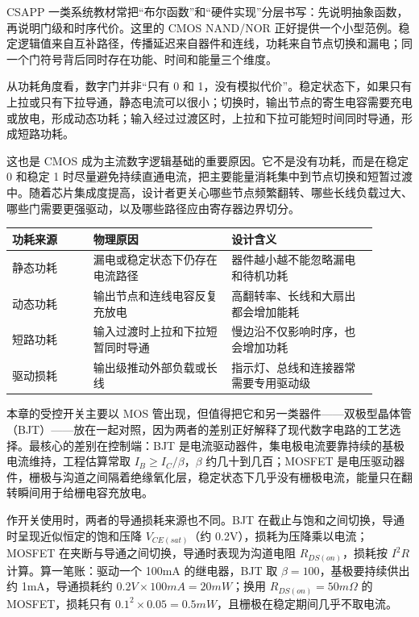 \begin{classicnote}
CSAPP 一类系统教材常把“布尔函数”和“硬件实现”分层书写：先说明抽象函数，再说明门级和时序代价。这里的 CMOS NAND/NOR 正好提供一个小型范例。稳定逻辑值来自互补路径，传播延迟来自器件和连线，功耗来自节点切换和漏电；同一个门符号背后同时存在功能、时间和能量三个维度。
\end{classicnote}

从功耗角度看，数字门并非“只有 0 和 1，没有模拟代价”。稳定状态下，如果只有上拉或只有下拉导通，静态电流可以很小；切换时，输出节点的寄生电容需要充电或放电，形成动态功耗；输入经过过渡区时，上拉和下拉可能短时间同时导通，形成短路功耗。

这也是 CMOS 成为主流数字逻辑基础的重要原因。它不是没有功耗，而是在稳定 0 和稳定 1 时尽量避免持续直通电流，把主要能量消耗集中到节点切换和短暂过渡中。随着芯片集成度提高，设计者更关心哪些节点频繁翻转、哪些长线负载过大、哪些门需要更强驱动，以及哪些路径应由寄存器边界切分。

\begin{longtable}{L{0.2\linewidth}L{0.34\linewidth}L{0.36\linewidth}}
\toprule
功耗来源 & 物理原因 & 设计含义 \\
\midrule
静态功耗 & 漏电或稳定状态下仍存在电流路径 & 器件越小越不能忽略漏电和待机功耗 \\\tablerowrule
动态功耗 & 输出节点和连线电容反复充放电 & 高翻转率、长线和大扇出都会增加能耗 \\\tablerowrule
短路功耗 & 输入过渡时上拉和下拉短暂同时导通 & 慢边沿不仅影响时序，也会增加功耗 \\\tablerowrule
驱动损耗 & 输出级推动外部负载或长线 & 指示灯、总线和连接器常需要专用驱动级 \\
\bottomrule
\end{longtable}

本章的受控开关主要以 MOS 管出现，但值得把它和另一类器件——双极型晶体管（BJT）——放在一起对照，因为两者的差别正好解释了现代数字电路的工艺选择。最核心的差别在控制端：BJT 是电流驱动器件，集电极电流要靠持续的基极电流维持，工程估算常取 $I_B \ge I_C/\beta$，$\beta$ 约几十到几百；MOSFET 是电压驱动器件，栅极与沟道之间隔着绝缘氧化层，稳定状态下几乎没有栅极电流，能量只在翻转瞬间用于给栅电容充放电。

作开关使用时，两者的导通损耗来源也不同。BJT 在截止与饱和之间切换，导通时呈现近似恒定的饱和压降 $V_{CE(sat)}$（约 0.2V），损耗为压降乘以电流；MOSFET 在夹断与导通之间切换，导通时表现为沟道电阻 $R_{DS(on)}$，损耗按 $I^2R$ 计算。算一笔账：驱动一个 100mA 的继电器，BJT 取 $\beta=100$，基极要持续供出约 1mA，导通损耗约 $0.2V \times 100mA = 20mW$；换用 $R_{DS(on)}=50m\Omega$ 的 MOSFET，损耗只有 $0.1^2 \times 0.05 = 0.5mW$，且栅极在稳定期间几乎不取电流。

